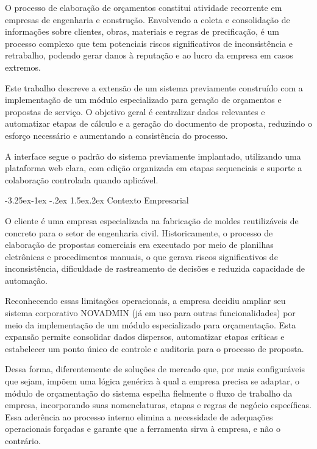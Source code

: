 \documentclass[
	article,
	12pt,				%
	oneside,
	a4paper,			%
	english,			%
	brazil				%
	]{abntex2}
\makeatletter
\renewcommand{\subsection}{%
  \@startsection{subsection}{2}{\z@}%
    {-3.25ex\@plus -1ex \@minus -.2ex}%
    {1.5ex\@plus .2ex}%
    {\normalfont\rmfamily\bfseries}%
}
\makeatother
\begin{document}
O processo de elaboração de orçamentos constitui atividade recorrente em
empresas de engenharia e construção. Envolvendo a coleta e consolidação de
informações sobre clientes, obras, materiais e regras de precificação, é um
processo complexo que tem potenciais riscos significativos de inconsistência e
retrabalho, podendo gerar danos à reputação e ao lucro da empresa em casos
extremos.

Este trabalho descreve a extensão de um sistema previamente construído com a
implementação de um módulo especializado para geração de orçamentos e propostas
de serviço. O objetivo geral é centralizar dados relevantes e automatizar
etapas de cálculo e a geração do documento de proposta, reduzindo o esforço
necessário e aumentando a consistência do processo.

A interface segue o padrão do sistema previamente implantado, utilizando uma
plataforma web clara, com edição organizada em etapas sequenciais e suporte a
colaboração controlada quando aplicável.

\subsection{Contexto Empresarial}

O cliente é uma empresa especializada na fabricação de moldes reutilizáveis de
concreto para o setor de engenharia civil. Historicamente, o processo de
elaboração de propostas comerciais era executado por meio de planilhas
eletrônicas e procedimentos manuais, o que gerava riscos significativos de
inconsistência, dificuldade de rastreamento de decisões e reduzida capacidade
de automação.

Reconhecendo essas limitações operacionais, a empresa decidiu ampliar seu
sistema corporativo NOVADMIN (já em uso para outras funcionalidades) por meio
da implementação de um módulo especializado para orçamentação. Esta expansão
permite consolidar dados dispersos, automatizar etapas críticas e estabelecer
um ponto único de controle e auditoria para o processo de proposta.

Dessa forma, diferentemente de soluções de mercado que, por mais configuráveis
que sejam, impõem uma lógica genérica à qual a empresa precisa se adaptar, o
módulo de orçamentação do sistema espelha fielmente o fluxo de trabalho da
empresa, incorporando suas nomenclaturas, etapas e regras de negócio
específicas. Essa aderência ao processo interno elimina a necessidade de
adequações operacionais forçadas e garante que a ferramenta sirva à empresa, e
não o contrário.
\end{document}
